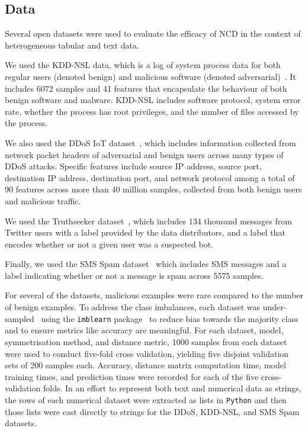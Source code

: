 \documentclass[preprint,12pt]{article}
\begin{document}
\subsection{Data}
\label{datasets}

Several open datasets were used to evaluate the efficacy of NCD in the context of heterogeneous tabular and text data.

We used the KDD-NSL data, which is a log of system process data for both regular users (denoted benign) and malicious software (denoted adversarial)~\cite{kddnsl}. It includes 6072 samples and 41 features that encapsulate the behaviour of both benign software and malware.
KDD-NSL includes software protocol, system error rate, whether the process has root privileges, and the number of files accessed by the process.

We also used the DDoS IoT dataset~\cite{ddos}, which includes information collected from network packet headers of adversarial and benign users across many types of DDoS attacks.
Specific features include source IP address, source port, destination IP address, destination port, and network protocol among a total of 90 features across more than 40 million samples, collected from both benign users and malicious traffic.

We used the Truthseeker dataset~\cite{truthseeker}, which includes 134 thousand messages from Twitter users with a label provided by the data distributors, and a label that encodes whether or not a given user was a suspected bot.

Finally, we used the SMS Spam dataset~\cite{sms_spam} which includes SMS messages and a label indicating whether or not a message is spam across 5575 samples.

For several of the datasets, malicious examples were rare compared to the number of benign examples. To address the class imbalances, each dataset was under-sampled~\cite{undersampling} using the \texttt{imblearn} package~\cite{imblearn} to reduce bias towards the majority class and to ensure metrics like accuracy are meaningful.
For each dataset, model, symmetrisation method, and distance metric, 1000 samples from each dataset were used to conduct five-fold cross validation, yielding five disjoint validation sets of 200 samples each.
Accuracy, distance matrix computation time, model training times, and prediction times were recorded for each of the five cross-validation folds. 
In an effort to represent both text and numerical data as strings, the rows of each numerical dataset were extracted as lists in \texttt{Python} and then those lists were cast directly to strings for the DDoS, KDD-NSL, and SMS Spam datasets.
\end{document}
